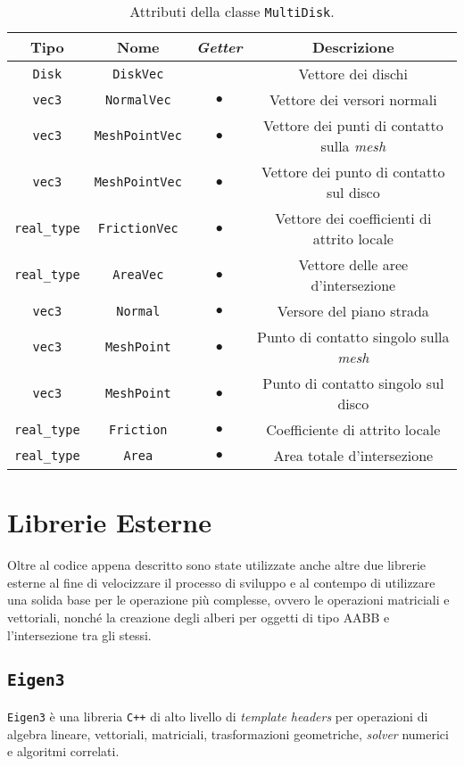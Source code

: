 \begin{table}[h!]
	\centering
	\begin{tabular}{|c|c|c|c|}
		\hline 
		\textbf{Tipo} & \textbf{Nome} & \textit{\textbf{Getter}} & \textbf{Descrizione} \\ \hline 
		\texttt{Disk} & \texttt{DiskVec} &  & Vettore dei dischi \\ \hline 
		\texttt{vec3} & \texttt{NormalVec} & $\bullet$ & Vettore dei versori normali \\ \hline
		\texttt{vec3} & \texttt{MeshPointVec} & $\bullet$ & Vettore dei punti di contatto sulla \textit{mesh} \\ \hline
		\texttt{vec3} & \texttt{MeshPointVec} & $\bullet$ & Vettore dei punto di contatto sul disco \\ \hline
		\texttt{real\_type} & \texttt{FrictionVec} & $\bullet$ & Vettore dei coefficienti di attrito locale \\ \hline
		\texttt{real\_type} & \texttt{AreaVec} & $\bullet$ & Vettore delle aree d'intersezione \\ \hline
		\texttt{vec3} & \texttt{Normal} & $\bullet$ & Versore del piano strada \\ \hline
		\texttt{vec3} & \texttt{MeshPoint} & $\bullet$ & Punto di contatto singolo sulla \textit{mesh} \\ \hline
		\texttt{vec3} & \texttt{MeshPoint} & $\bullet$ & Punto di contatto singolo sul disco \\ \hline
		\texttt{real\_type} & \texttt{Friction} & $\bullet$ & Coefficiente di attrito locale \\ \hline
		\texttt{real\_type} & \texttt{Area} & $\bullet$ & Area totale d'intersezione \\ \hline
	\end{tabular}
	\caption{Attributi della classe \texttt{MultiDisk}.}
	\label{}
\end{table}
%
\section{Librerie Esterne}
Oltre al codice appena descritto sono state utilizzate anche altre due librerie esterne al fine di velocizzare il processo di sviluppo e al contempo di utilizzare una solida base per le operazione più complesse, ovvero le operazioni matriciali e vettoriali, nonché la creazione degli alberi per oggetti di tipo \ac{AABB} e l'intersezione tra gli stessi.
%
\subsection{\texttt{Eigen3}}
\texttt{Eigen3} è una libreria \texttt{C++} di alto livello di \textit{template headers} per operazioni di algebra lineare, vettoriali, matriciali, trasformazioni geometriche, \textit{solver} numerici e algoritmi correlati.

